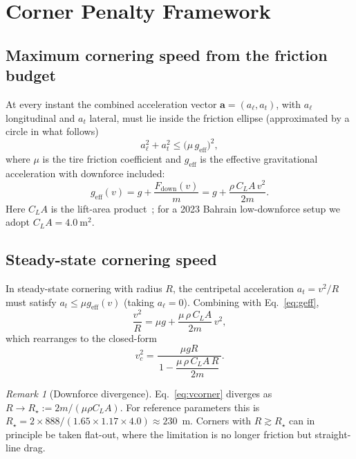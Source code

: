 \documentclass[11pt,twocolumn]{article}
\theoremstyle{definition}
\theoremstyle{remark}
\newtheorem{remark}[theorem]{Remark}
\begin{document}
\section{Corner Penalty Framework}
\label{sec:curves}

\subsection{Maximum cornering speed from the friction budget}

At every instant the combined acceleration vector $\bm{a} = (a_\ell, a_t)$,
with $a_\ell$ longitudinal and $a_t$ lateral, must lie inside the friction
ellipse (approximated by a circle in what follows)
\begin{equation}
  a_\ell^2 + a_t^2 \le \bigl( \mu\, g_{\mathrm{eff}} \bigr)^2,
  \label{eq:frictioncircle}
\end{equation}
where $\mu$ is the tire friction coefficient and $g_{\mathrm{eff}}$ is the
effective gravitational acceleration with downforce included:
\begin{equation}
  g_{\mathrm{eff}}(v) = g + \frac{F_{\mathrm{down}}(v)}{m}
  = g + \frac{\rho\, C_L A\, v^2}{2 m}.
  \label{eq:geff}
\end{equation}
Here $C_L A$ is the lift-area product~\cite{katz1995,hoerner1965,zhang2006};
for a 2023 Bahrain low-downforce setup we adopt $C_L A = 4.0~\mathrm{m}^2$.

\subsection{Steady-state cornering speed}

In steady-state cornering with radius $R$, the centripetal acceleration
$a_t = v^2/R$ must satisfy $a_t \le \mu g_{\mathrm{eff}}(v)$ (taking $a_\ell = 0$).
Combining with Eq.~\eqref{eq:geff},
\begin{equation}
  \frac{v^2}{R} = \mu g + \frac{\mu\, \rho\, C_L A}{2 m}\, v^2,
\end{equation}
which rearranges to the closed-form
\begin{equation}
\boxed{\;
  v_c^2 = \frac{\mu g R}{\,1 - \dfrac{\mu\,\rho\, C_L A\, R}{2 m}\,}.
\;}
  \label{eq:vcorner}
\end{equation}

\begin{remark}[Downforce divergence]
\label{rem:divergence}
Eq.~\eqref{eq:vcorner} diverges as
$R \to R_{\star} := 2m/(\mu\rho C_L A)$. For reference parameters this is
$R_{\star} = 2\times 888/(1.65 \times 1.17 \times 4.0) \approx 230$~m. Corners
with $R \gtrsim R_{\star}$ can in principle be taken flat-out, where the
limitation is no longer friction but straight-line drag.
\end{remark}
\end{document}
